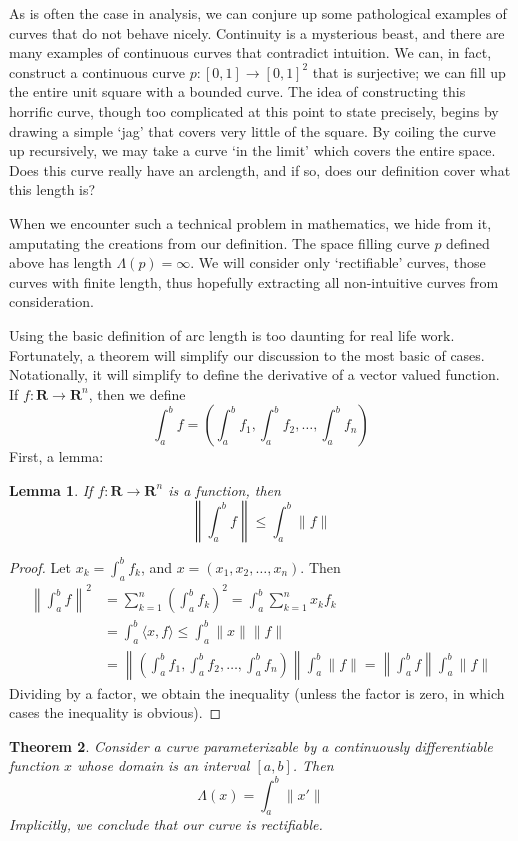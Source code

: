 \documentclass[12pt]{amsbook}
\theoremstyle{plain}
\newtheorem{theorem}{Theorem}
\newtheorem{lemma}[theorem]{Lemma}
\theoremstyle{definition}
\begin{document}

As is often the case in analysis, we can conjure up some pathological examples of curves that do not behave nicely. Continuity is a mysterious beast, and there are many examples of continuous curves that contradict intuition. We can, in fact, construct a continuous curve $p:[0,1] \to [0,1]^2$ that is surjective; we can fill up the entire unit square with a bounded curve. The idea of constructing this horrific curve, though too complicated at this point to state precisely, begins by drawing a simple `jag' that covers very little of the square. By coiling the curve up recursively, we may take a curve `in the limit' which covers the entire space. Does this curve really have an arclength, and if so, does our definition cover what this length is?


When we encounter such a technical problem in mathematics, we hide from it, amputating the creations from our definition. The space filling curve $p$ defined above has length $\Lambda(p) = \infty$. We will consider only `rectifiable' curves, those curves with finite length, thus hopefully extracting all non-intuitive curves from consideration.

Using the basic definition of arc length is too daunting for real life work. Fortunately, a theorem will simplify our discussion to the most basic of cases. Notationally, it will simplify to define the derivative of a vector valued function. If $f:\mathbf{R} \to \mathbf{R}^n$, then we define
%
\[ \int_a^b f = \left( \int_a^b f_1, \int_a^b f_2, \dots, \int_a^b f_n \right) \]
%
First, a lemma:
%
\begin{lemma}
    If $f:\mathbf{R} \to \mathbf{R}^n$ is a function, then
    \[ \left\| \int_a^b f \right\| \leq \int_a^b \| f \| \]
\end{lemma}
%
\begin{proof}
    Let $x_k = \int_a^b f_k$, and $x = (x_1, x_2, \dots, x_n)$. Then
    \begin{align*}
        \left\| \int_a^b f \right\|^2 &= \sum_{k = 1}^n \left( \int_a^b f_k \right)^2 = \int_a^b \sum_{k = 1}^n x_k f_k\\
        &= \int_a^b \langle x, f \rangle \leq \int_a^b \|x\|\|f\|\\
        &= \left\| \left( \int_a^b f_1, \int_a^b f_2, \dots, \int_a^b f_n \right) \right\| \int_a^b \|f\| = \left\| \int_a^b f \right \| \int_a^b \|f\|
    \end{align*}
    Dividing by a factor, we obtain the inequality (unless the factor is zero, in which cases the inequality is obvious).
\end{proof}
%
\begin{theorem}
    Consider a curve parameterizable by a continuously differentiable function $x$ whose domain is an interval $[a,b]$. Then
    \[ \Lambda(x) = \int_a^b \|x'\| \]
    Implicitly, we conclude that our curve is rectifiable.
\end{theorem}
\end{document}
